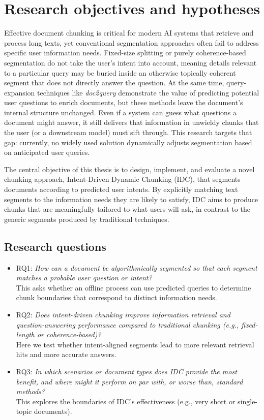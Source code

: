 \documentclass[12pt,a4paper]{report}
\begin{document}
\section{Research objectives and hypotheses}

Effective document chunking is critical for modern AI systems that retrieve and process long texts, yet conventional segmentation approaches often fail to address specific user information needs. Fixed-size splitting or purely coherence-based segmentation do not take the user's intent into account, meaning details relevant to a particular query may be buried inside an otherwise topically coherent segment that does not directly answer the question. At the same time, query-expansion techniques like \textit{doc2query} demonstrate the value of predicting potential user questions to enrich documents, but these methods leave the document's internal structure unchanged. Even if a system can guess what questions a document might answer, it still delivers that information in unwieldy chunks that the user (or a downstream model) must sift through. This research targets that gap: currently, no widely used solution dynamically adjusts segmentation based on anticipated user queries.

The central objective of this thesis is to design, implement, and evaluate a novel chunking approach, Intent-Driven Dynamic Chunking (IDC), that segments documents according to predicted user intents. By explicitly matching text segments to the information needs they are likely to satisfy, IDC aims to produce chunks that are meaningfully tailored to what users will ask, in contrast to the generic segments produced by traditional techniques.

\subsection{Research questions}
\begin{itemize}
\item RQ1: \emph{How can a document be algorithmically segmented so that each segment matches a probable user question or intent?}\\
This asks whether an offline process can use predicted queries to determine chunk boundaries that correspond to distinct information needs.

\item RQ2: \emph{Does intent-driven chunking improve information retrieval and question-answering performance compared to traditional chunking (e.g., fixed-length or coherence-based)?}\\
Here we test whether intent-aligned segments lead to more relevant retrieval hits and more accurate answers.

\item RQ3: \emph{In which scenarios or document types does IDC provide the most benefit, and where might it perform on par with, or worse than, standard methods?}\\
This explores the boundaries of IDC's effectiveness (e.g., very short or single-topic documents).
\end{itemize}
\end{document}
